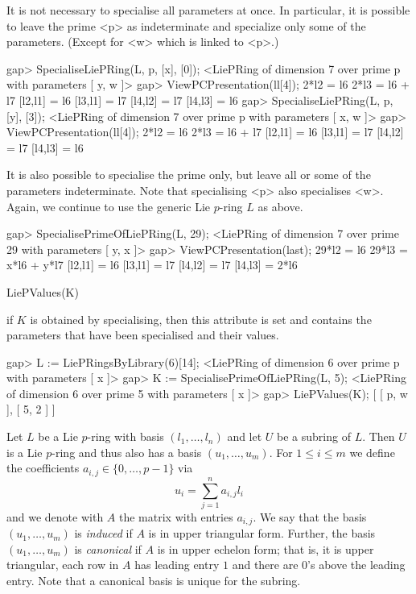 It is not necessary to specialise all parameters at once. In particular,
it is possible to leave the prime <p> as indeterminate and specialize only
some of the parameters. (Except for <w> which is linked to <p>.)

\beginexample
gap> SpecialiseLiePRing(L, p, [x], [0]);
<LiePRing of dimension 7 over prime p with parameters [ y, w ]>
gap> ViewPCPresentation(ll[4]);
2*l2 = l6
2*l3 = l6 + l7
[l2,l1] = l6
[l3,l1] = l7
[l4,l2] = l7
[l4,l3] = l6
gap> SpecialiseLiePRing(L, p, [y], [3]);
<LiePRing of dimension 7 over prime p with parameters [ x, w ]>
gap> ViewPCPresentation(ll[4]);
2*l2 = l6
2*l3 = l6 + l7
[l2,l1] = l6
[l3,l1] = l7
[l4,l2] = l7
[l4,l3] = l6
\endexample

It is also possible to specialise the prime only, but leave all or
some of the parameters indeterminate. Note that specialising <p>
also specialises <w>. Again, we continue to use the generic Lie 
$p$-ring $L$ as above.

\beginexample
gap> SpecialisePrimeOfLiePRing(L, 29);
<LiePRing of dimension 7 over prime 29 with parameters [ y, x ]>
gap> ViewPCPresentation(last);
29*l2 = l6
29*l3 = x*l6 + y*l7
[l2,l1] = l6
[l3,l1] = l7
[l4,l2] = l7
[l4,l3] = 2*l6
\endexample

\> LiePValues(K)

if $K$ is obtained by specialising, then this attribute is set and 
contains the parameters that have been specialised and their values.

\beginexample
gap>  L := LiePRingsByLibrary(6)[14];
<LiePRing of dimension 6 over prime p with parameters [ x ]>
gap>  K := SpecialisePrimeOfLiePRing(L, 5);
<LiePRing of dimension 6 over prime 5 with parameters [ x ]>
gap> LiePValues(K);
[ [ p, w ], [ 5, 2 ] ]
\endexample


Let $L$ be a Lie $p$-ring with basis $(l_1, \ldots, l_n)$ and let $U$ be a 
subring of $L$. Then $U$ is a Lie $p$-ring and thus also has a basis $(u_1, 
\ldots, u_m)$. For $1 \leq i \leq m$ we define the coefficients $a_{i,j} 
\in \{0, \ldots, p-1\}$ via 
$$ u_i = \sum_{j=1}^n a_{i,j} l_i $$
and we denote with $A$ the matrix with entries $a_{i,j}$. We say that the 
basis $(u_1, \ldots, u_m)$ is {\it induced} if $A$ is in upper triangular 
form. Further, the basis $(u_1, \ldots, u_m)$ is {\it canonical} if $A$ is 
in upper echelon form; that is, it is upper triangular, each row in $A$ has 
leading entry $1$ and there are $0$'s above the leading entry. Note that a
canonical basis is unique for the subring.

